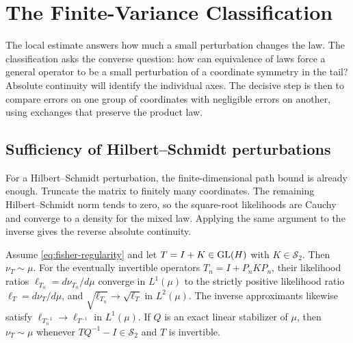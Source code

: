 \section{The Finite-Variance Classification}

The local estimate answers how much a small perturbation changes the law.
The classification asks the converse question: how can equivalence of laws
force a general operator to be a small perturbation of a coordinate symmetry
in the tail? Absolute continuity will identify the individual axes. The
decisive step is then to compare errors on one group of coordinates with
negligible errors on another, using exchanges that preserve the product law.

\subsection{Sufficiency of Hilbert--Schmidt perturbations}

For a Hilbert--Schmidt perturbation, the finite-dimensional path bound is
already enough. Truncate the matrix to finitely many coordinates. The
remaining Hilbert--Schmidt norm tends to zero, so the square-root likelihoods
are Cauchy and converge to a density for the mixed law. Applying the same
argument to the inverse gives the reverse absolute continuity.

\begin{proposition}
\label{prop:hilbert-schmidt-sufficiency}
Assume \eqref{eq:fisher-regularity} and let
$T=I+K\in\operatorname{GL}(H)$ with $K\in\mathcal S_2$.
Then \(\nu_T\sim\mu\).
For the eventually invertible operators
$T_n=I+P_nKP_n$, their likelihood ratios
$\ell_{T_n}=d\nu_{T_n}/d\mu$ converge in $L^1(\mu)$ to the strictly
positive likelihood ratio $\ell_T=d\nu_T/d\mu$, and
$\sqrt{\ell_{T_n}}\to\sqrt{\ell_T}$ in $L^2(\mu)$.
The inverse approximants likewise satisfy
\(\ell_{T_n^{-1}}\to\ell_{T^{-1}}\) in \(L^1(\mu)\).
If $Q$ is an exact linear stabilizer of $\mu$, then \(\nu_T\sim\mu\)
whenever \(TQ^{-1}-I\in\mathcal S_2\) and \(T\) is invertible.
\end{proposition}

